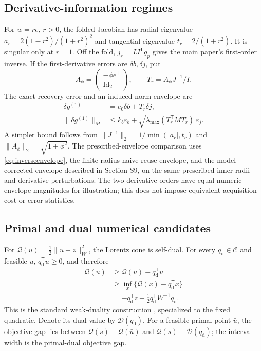 \subsection{Derivative-information regimes}
For $w=re$, $r>0$, the folded Jacobian has radial eigenvalue $a_r=2(1-r^2)/(1+r^2)^2$ and tangential eigenvalue $t_r=2/(1+r^2)$. It is singular only at $r=1$. Off the fold, $j_r=IJ^{\mathsf T}g_p$ gives the main paper's first-order inverse. If the first-derivative errors are $\delta b,\delta j$, put
\begin{equation}
 A_\phi=\begin{pmatrix}-\phi e^{\mathsf T}\\\operatorname{Id}_2\end{pmatrix},\qquad
 T_r=A_\phi J^{-1}/I.
 \label{eq:inverseerroroperator}
\end{equation}
The exact recovery error and an induced-norm envelope are
\begin{equation}
 \begin{aligned}
 \delta g^{(1)}&=e_0\delta b+T_r\delta j,\\
 \|\delta g^{(1)}\|_M&\leq k_b\varepsilon_b+
 \sqrt{\lambda_{\max}(T_r^{\mathsf T}MT_r)}\,\varepsilon_j.
 \end{aligned}
 \label{eq:inverseenvelope}
\end{equation}
A simpler bound follows from $\|J^{-1}\|_2=1/\min(|a_r|,t_r)$ and $\|A_\phi\|_2=\sqrt{1+\phi^2}$. The prescribed-envelope comparison uses \eqref{eq:inverseenvelope}, the finite-radius naive-reuse envelope, and the model-corrected envelope described in Section S9, on the same prescribed inner radii and derivative perturbations. The two derivative orders have equal numeric envelope magnitudes for illustration; this does not impose equivalent acquisition cost or error statistics.

\subsection{Primal and dual numerical candidates}
For $\mathcal Q(u)=\tfrac12\|u-z\|_W^2$, the Lorentz cone is self-dual. For every $q_{\mathrm d}\in\mathcal C$ and feasible $u$, $q_{\mathrm d}^{\mathsf T}u\geq0$, and therefore
\begin{equation}
 \begin{aligned}
 \mathcal Q(u)&\geq \mathcal Q(u)-q_{\mathrm d}^{\mathsf T}u\\
 &\geq\inf_x\{\mathcal Q(x)-q_{\mathrm d}^{\mathsf T}x\}\\
 &=-q_{\mathrm d}^{\mathsf T}z-\tfrac12q_{\mathrm d}^{\mathsf T}W^{-1}q_{\mathrm d}.
 \end{aligned}
 \label{eq:dualgapderivation}
\end{equation}
This is the standard weak-duality construction \cite{cvxbook}, specialized to the fixed quadratic. Denote its dual value by $\mathcal D(q_{\mathrm d})$. For a feasible primal point $\bar u$, the objective gap lies between $\mathcal Q(s)-\mathcal Q(\bar u)$ and $\mathcal Q(s)-\mathcal D(q_{\mathrm d})$; the interval width is the primal-dual objective gap.

